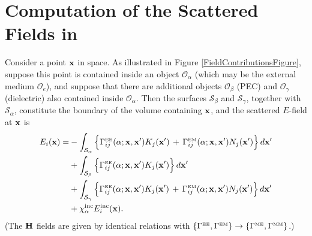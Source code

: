 \documentclass[letterpaper]{article}
\begin{document}
\section{Computation of the Scattered Fields in \ls}

Consider a point $\mathbf{x}$ in space. As illustrated in 
Figure \ref{FieldContributionsFigure}, suppose this point 
is contained inside an object $\mathcal{O}_\alpha$ (which
may be the external medium $\mathcal{O}_e$), and suppose
that there are additional objects 
$\mathcal{O}_\beta$ (PEC) and $\mathcal{O}_\gamma$ (dielectric) 
also contained inside $\mathcal{O}_\alpha$. 
Then the surfaces $\mathcal{S}_\beta$ and $\mathcal{S}_\gamma$,
together with $\mathcal{S}_\alpha$, constitute the boundary of 
the volume containing $\mathbf{x}$, and the scattered $E$-field at 
$\mathbf{x}$ is
\begin{align} 
E_i(\mathbf{x}) 
    = &-\int_{\mathcal{S}_\alpha} 
           \Big\{ \Gamma_{ij}^{\hbox{\tiny{EE}}}(\alpha; \mathbf{x}, \mathbf{x}^\prime) 
                   K_j(\mathbf{x}^\prime)
                  \,+\,
                   \Gamma_{ij}^{\hbox{\tiny{EM}}}(\alpha; \mathbf{x}, \mathbf{x}^\prime) 
                   N_j(\mathbf{x}^\prime)
           \Big\} \, d\mathbf{x}^\prime
\nonumber \\
     &+\int_{\mathcal{S}_\beta} 
           \Big\{ \Gamma_{ij}^{\hbox{\tiny{EE}}}(\alpha; \mathbf{x}, \mathbf{x}^\prime)
                   K_j(\mathbf{x}^\prime)
           \Big\} \, d\mathbf{x}^\prime
\nonumber \\
     &+\int_{\mathcal{S}_\gamma} 
           \Big\{ \Gamma_{ij}^{\hbox{\tiny{EE}}}(\alpha; \mathbf{x}, \mathbf{x}^\prime) 
                   K_j(\mathbf{x}^\prime)
                  \,+\,
                   \Gamma_{ij}^{\hbox{\tiny{EM}}}(\alpha; \mathbf{x}, \mathbf{x}^\prime) 
                   N_j(\mathbf{x}^\prime)
           \Big\} \, d\mathbf{x}^\prime
\nonumber \\
     &+\chi_\alpha^{\hbox{\scriptsize{inc}}} E^{\hbox{\scriptsize{inc}}}_i(\mathbf{x}).
\label{FieldContributionsEquation}
\end{align}
(The $\mathbf{H}$ fields are given by identical relations with 
$\{ \Gamma^{\hbox{\tiny{EE}}}, \Gamma^{\hbox{\tiny{EM}}}\}  \to 
 \{ \Gamma^{\hbox{\tiny{ME}}}, \Gamma^{\hbox{\tiny{MM}}}\}$.) 
\end{document}
